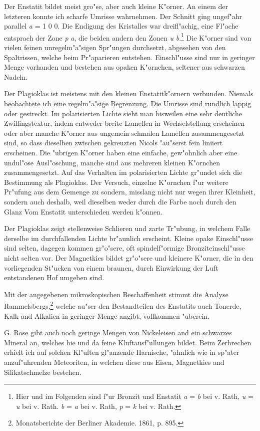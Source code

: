 \documentclass[a4paper, 11pt, oneside, polutonikogreek, german]{article}
\begin{document}
Der Enstatit bildet meist gro"se, aber auch kleine K"orner. An einem der letzteren konnte ich scharfe Umrisse wahrnehmen. Der Schnitt ging ungef"ahr parallel \emph{a} = 1 0 0. Die Endigung des Kristalles war dreifl"achig, eine Fl"ache entsprach der Zone \emph{p} \emph{a},  die beiden andern den Zonen \emph{u} \emph{b}.\footnote{Hier und im Folgenden sind f"ur Bronzit und Enstatit \emph{a} = \emph{b} bei v. Rath, \emph{u} = \emph{u} bei v. Rath. \emph{b} = \emph{a} bei v. Rath, \emph{p} = \emph{k} bei v. Rath.} Die K"orner sind von vielen feinen unregelm"a"sigen Spr"ungen durchsetzt, abgesehen von den Spaltrissen, welche beim Pr"aparieren entstehen. Einschl"usse sind nur in geringer Menge vorhanden und bestehen aus opaken K"ornchen, seltener aus schwarzen Nadeln.

Der Plagioklas ist meistens mit den kleinen Enstatitk"ornern verbunden. Niemals beobachtete ich eine regelm"a"sige Begrenzung. Die Umrisse sind rundlich lappig oder gestreckt. Im polarisierten Lichte sieht man bisweilen eine sehr deutliche Zwillingstextur, indem entweder breite Lamellen in Wechselstellung erscheinen oder aber manche K"orner aus ungemein schmalen Lamellen zusammengesetzt sind, so dass dieselben zwischen gekreuzten Nicols "au"serst fein liniiert erscheinen. Die "ubrigen K"orner haben eine einfache, gew"ohnlich aber eine undul"ose Ausl"oschung, manche sind aus mehreren kleinen K"ornchen zusammengesetzt. Auf das Verhalten im polarisierten Lichte gr"undet sich die Bestimmung als Plagioklas. Der Versuch, einzelne K"ornchen f"ur weitere Pr"ufung aus dem Gemenge zu sondern, misslang nicht nur wegen ihrer Kleinheit, sondern auch deshalb, weil dieselben weder durch die Farbe noch durch den Glanz Vom Enstatit unterschieden werden k"onnen.

Der Plagioklas zeigt stellenweise Schlieren und zarte Tr"ubung, in welchem Falle derselbe im durchfallenden Lichte br"aunlich erscheint. Kleine opake Einschl"usse sind selten, dagegen kommen gr"o"sere, oft spindelf"ormige Bronziteinschl"usse nicht selten vor. Der Magnetkies bildet gr"o"sere und kleinere K"orner, die in den vorliegenden St"ucken von einem braunen, durch Einwirkung der Luft entstandenen Hof umgeben sind.

Mit der angegebenen mikroskopischen Beschaffenheit stimmt die Analyse Rammelsbergs,\footnote{Monatsberichte der Berliner Akademie. 1861, p. 895.} welche au"ser den Bestandteilen des Enstatits auch Tonerde, Kalk and Alkalien in geringer Menge angibt, vollkommen "uberein.

G. Rose gibt auch noch geringe Mengen von Nickeleisen and ein schwarzes Mineral an, welches hie und da feine Kluftausf"ullungen bildet. Beim Zerbrechen erhielt ich auf solchen Kl"uften gl"anzende Harnische, "ahnlich wie in sp"ater anzuf"uhrenden Meteoriten, in welchen diese aus Eisen, Magnetkies and Silikatschmelze bestehen.
\end{document}
